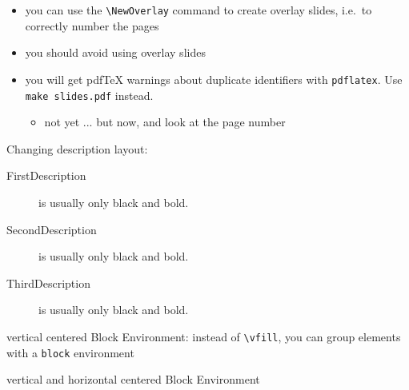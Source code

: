 \documentclass[11pt, a4paper, landscape]{article}
\begin{document}
\NewOverlay{}
\vfill
\begin{itemize}
\item you can use the \texttt{\textbackslash NewOverlay} command to create
  overlay slides, i.e.\ to correctly number the pages
\item you should avoid using overlay slides
\item you will get pdfTeX warnings about duplicate identifiers with
  \texttt{pdflatex}. Use \texttt{make slides.pdf} instead.
  \begin{itemize}
  \item not yet ... but now, and look at the page number
  \end{itemize}
\end{itemize}
\vfill


\NewPage{}
\begin{block}
  Changing description layout:
  \begin{description}
  \item[FirstDescription] is usually only black and bold.
  \item[SecondDescription] is usually only black and bold.
  \item[ThirdDescription] is usually only black and bold.
  \end{description}
\end{block}

\begin{block}
  vertical centered Block Environment: instead of \texttt{\textbackslash vfill},
  you can group elements with a \texttt{block} environment
\end{block}

\begin{hvcenter}
  vertical and horizontal centered Block Environment
\end{hvcenter}
\end{document}
